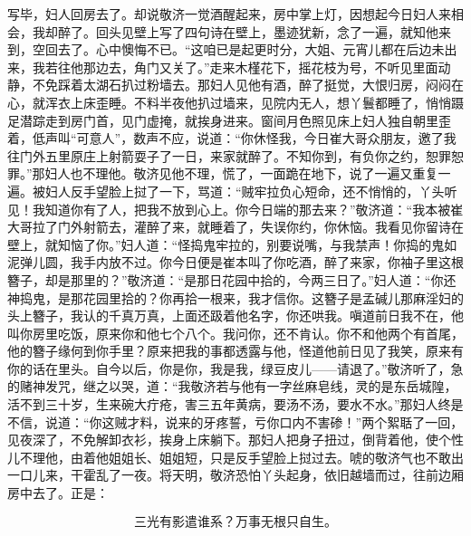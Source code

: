 写毕，妇人回房去了。却说敬济一觉酒醒起来，房中掌上灯，因想起今日妇人来相会，我却醉了。回头见壁上写了四句诗在壁上，墨迹犹新，念了一遍，就知他来到，空回去了。心中懊悔不已。“这咱已是起更时分，大姐、元宵儿都在后边未出来，我若往他那边去，角门又关了。”走来木槿花下，摇花枝为号，不听见里面动静，不免踩着太湖石扒过粉墙去。那妇人见他有酒，醉了挺觉，大恨归房，闷闷在心，就浑衣上床歪睡。不料半夜他扒过墙来，见院内无人，想丫鬟都睡了，悄悄蹑足潜踪走到房门首，见门虚掩，就挨身进来。窗间月色照见床上妇人独自朝里歪着，低声叫“可意人”，数声不应，说道：“你休怪我，今日崔大哥众朋友，邀了我往门外五里原庄上射箭耍子了一日，来家就醉了。不知你到，有负你之约，恕罪恕罪。”那妇人也不理他。敬济见他不理，慌了，一面跪在地下，说了一遍又重复一遍。被妇人反手望脸上挝了一下，骂道：“贼牢拉负心短命，还不悄悄的，丫头听见！我知道你有了人，把我不放到心上。你今日端的那去来？”敬济道：“我本被崔大哥拉了门外射箭去，灌醉了来，就睡着了，失误你约，你休恼。我看见你留诗在壁上，就知恼了你。”妇人道：“怪捣鬼牢拉的，别要说嘴，与我禁声！你捣的鬼如泥弹儿圆，我手内放不过。你今日便是崔本叫了你吃酒，醉了来家，你袖子里这根簪子，却是那里的？”敬济道：“是那日花园中拾的，今两三日了。”妇人道：“你还神捣鬼，是那花园里拾的？你再拾一根来，我才信你。这簪子是孟碱儿那麻淫妇的头上簪子，我认的千真万真，上面还趿着他名字，你还哄我。嗔道前日我不在，他叫你房里吃饭，原来你和他七个八个。我问你，还不肯认。你不和他两个有首尾，他的簪子缘何到你手里？原来把我的事都透露与他，怪道他前日见了我笑，原来有你的话在里头。自今以后，你是你，我是我，绿豆皮儿——请退了。”敬济听了，急的赌神发咒，继之以哭，道：“我敬济若与他有一字丝麻皂线，灵的是东岳城隍，活不到三十岁，生来碗大疔疮，害三五年黄病，要汤不汤，要水不水。”那妇人终是不信，说道：“你这贼才料，说来的牙疼誓，亏你口内不害碜！”两个絮聒了一回，见夜深了，不免解卸衣衫，挨身上床躺下。那妇人把身子扭过，倒背着他，使个性儿不理他，由着他姐姐长、姐姐短，只是反手望脸上挝过去。唬的敬济气也不敢出一口儿来，干霍乱了一夜。将天明，敬济恐怕丫头起身，依旧越墙而过，往前边厢房中去了。正是：

\[
三光有影遣谁系？万事无根只自生。
\]
